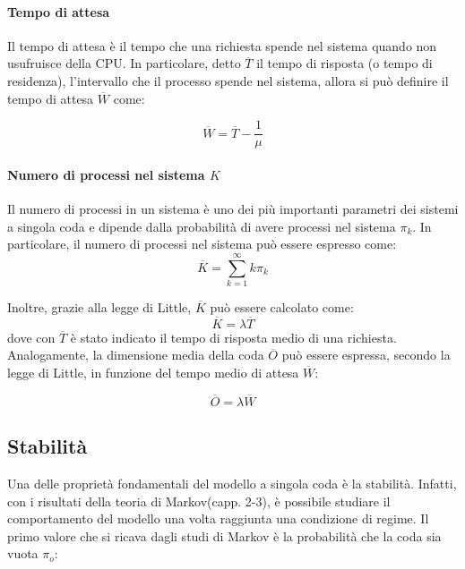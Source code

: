 \paragraph{Tempo di attesa}
Il tempo di attesa è il tempo che una richiesta spende nel sistema quando non usufruisce della CPU. In particolare, detto $\overline{T}$ il tempo di risposta (o tempo di residenza), l'intervallo che il processo spende nel sistema, allora si può definire il tempo di attesa $\overline{W}$ come:

\begin{equation}
    \overline{W} = \overline{T} - \frac{1}{\mu}
\end{equation}

\paragraph{Numero di processi nel sistema $K$}
Il numero di processi in un sistema è uno dei più importanti parametri dei sistemi a singola coda e dipende dalla probabilità di avere processi nel sistema $\pi_k$. In particolare, il numero di processi nel sistema può essere espresso come\cite{bolch2006queueing}:
\begin{equation}
    \overline{K} = \sum_{k=1}^{\infty}k\pi_k
\end{equation}

Inoltre, grazie alla legge di Little\cite{wiki:littlelaw}, $\overline{K}$ può essere calcolato come:
\begin{equation}
    \overline{K} =\lambda\overline{T}
\end{equation}
dove con $\overline{T}$ è stato indicato il tempo di risposta medio di una richiesta. Analogamente, la dimensione media della coda $\overline{O}$ può essere espressa, secondo la legge di Little, in funzione del tempo medio di attesa $\overline{W}$:

\begin{equation}
    \overline{O} =\lambda\overline{W}
\end{equation}

\subsection{Stabilità}
Una delle proprietà fondamentali del modello a singola coda è la stabilità. Infatti, con i risultati della teoria di Markov\cite{bolch2006queueing}(capp. 2-3), è possibile studiare il comportamento del modello una volta raggiunta una condizione di regime. Il primo valore che si ricava dagli studi di Markov è la probabilità che la coda sia vuota $\pi_o$:

